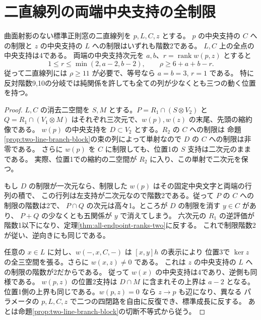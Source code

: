 \section{二直線列の両端中央支持の全制限}
\label{sec:two-line-full-middle-restriction}
\begin{theorem}\label{thm:two-line-full-middle-restriction}
曲面射影のない標準正則窓の二直線列を $p,L,C,z$ とする。
$p$ の中央支持の $C$ への制限と $z$ の中央支持の $L$ への制限はいずれも階数2である。
$L,C$ 上の全点の中央支持は4である。
両端の中央支持次元を $a,b$、$r=\operatorname{rank}w(p,z)$ とすると
\[
             1\le r\le\min(2,a-2,b-2),\qquad \rho\ge6+a+b-r .
\]
従って二直線列には $\rho\ge11$ が必要で、等号なら $a=b=3$, $r=1$ である。
特に反対階数9,10の分岐では純関係を許しても全ての列が少なくとも三つの動く位置を持つ。
\end{theorem}
\begin{proof}
$L,C$ の消去二空間を $S,M$ とする。$P=R_1\cap(S\otimes V_2)$ と
$Q=R_1\cap(V_1\otimes M)$ はそれぞれ三次元で、$w(p),w(z)$ の末尾、先頭の縮約像である。
$w(p)$ の中央支持を $D\subset V_2$ とする。$R_2$ の $C$ への制限は
命題\ref{prop:two-line-branch-block}の束の列によって単射なので $D$ の $C$ への制限は非零である。
さらに $w(p)$ を $C$ に制限しても、位置1の $S$ 支持は二次元のままである。
実際、位置1での縮約の二空間が $R_2$ に入り、この単射で二次元を保つ。

もし $D$ の制限が一次元なら、制限した $w(p)$ はその固定中央文字と両端の行列の積で、
この行列は左支持が二次元なので階数2である。従って $P$ の $C$ への制限の階数は2で、
$P\cap Q$ の次元は高々1。ところが $D$ の制限を消す $y\in C$ があり、
$P+Q$ の少なくとも五関係が $y$ で消えてしまう。
六次元の $R_1$ の逆評価が階数1以下になり、定理\ref{thm:all-endpoint-ranks-two}に反する。
これで制限階数2が従い、逆向きにも同じである。

任意の $x\in L$ に対し、$w(-,x,C,-)$ は $[x,y]h$ の表示により
位置3で $\ker z$ の全三空間を張る。さらに $w(x,z)\ne0$ である。
これは $z$ の中央支持の $L$ への制限の階数が2だからである。
従って $w(x)$ の中央支持は4であり、逆側も同様である。
$w(p,z)$ の位置2支持は $D\cap M$ に含まれその上界は $a-2$ となる。
位置1側の上界も同じである。$w(p,z)=0$ なら $z\to p$ も辺になり、異なる
パラメータの $p,L,C,z$ で二つの四閉路を自由に反復でき、標準成長に反する。
あとは命題\ref{prop:two-line-branch-block}の切断不等式から従う。
\end{proof}
